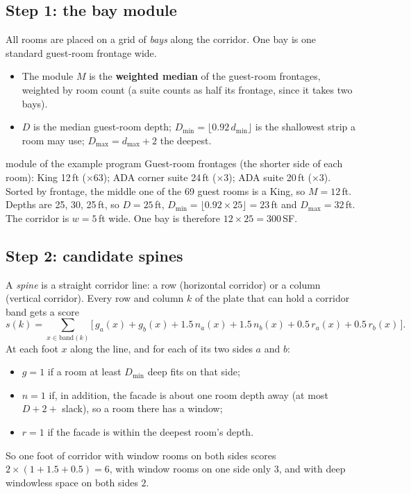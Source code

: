 \documentclass[10pt,a4paper]{article}
\begin{document}
\subsection{Step 1: the bay module}
All rooms are placed on a grid of \emph{bays} along the corridor. One bay is one standard guest-room frontage wide.
\begin{itemize}
\item The module $M$ is the \textbf{weighted median} of the guest-room frontages, weighted by room count (a suite
counts as half its frontage, since it takes two bays).
\item $D$ is the median guest-room depth; $D_{\min} = \lfloor 0.92\, d_{\min} \rfloor$ is the shallowest strip a room may
use; $D_{\max} = d_{\max} + 2$ the deepest.
\end{itemize}
\begin{example}{module of the example program}
Guest-room frontages (the shorter side of each room): King 12\,ft ($\times$63); ADA corner suite 24\,ft ($\times$3); ADA suite 20\,ft ($\times$3). Sorted by frontage, the middle one of the 69 guest
rooms is a King, so $M = 12$\,ft. Depths are 25, 30, 25\,ft, so $D = 25$\,ft, $D_{\min} = \lfloor 0.92 \times 25 \rfloor =
23$\,ft and $D_{\max} = 32$\,ft. The corridor is $w = 5$\,ft wide. One bay is therefore
$12 \times 25 = 300$\,SF.
\end{example}

\subsection{Step 2: candidate spines}
A \emph{spine} is a straight corridor line: a row (horizontal corridor) or a column (vertical corridor). Every row and
column $k$ of the plate that can hold a corridor band gets a score
\[ s(k) = \sum_{x \in \text{band}(k)} \big[\, g_a(x) + g_b(x) + 1.5\,n_a(x) + 1.5\,n_b(x) + 0.5\,r_a(x) + 0.5\,r_b(x) \,\big]. \]
At each foot $x$ along the line, and for each of its two sides $a$ and $b$:
\begin{itemize}
\item $g = 1$ if a room at least $D_{\min}$ deep fits on that side;
\item $n = 1$ if, in addition, the facade is about one room depth away (at most $D + 2 +$ slack), so a room there has
a window;
\item $r = 1$ if the facade is within the deepest room's depth.
\end{itemize}
So one foot of corridor with window rooms on both sides scores $2 \times (1 + 1.5 + 0.5) = 6$, with window rooms on one
side only $3$, and with deep windowless space on both sides $2$.
\end{document}
